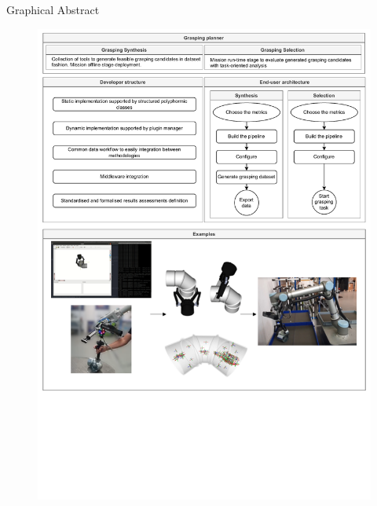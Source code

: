 \begin{center}
\large{Graphical Abstract}
\vspace{2cm}
\begin{figure}[hb]
\centerline{\includegraphics[trim={0cm 6.5cm 0cm 0cm},clip,width=1\linewidth,angle=0]{Cap0/Figuras/graphical_abstract_v4.pdf}}
\end{figure}

\end{center}